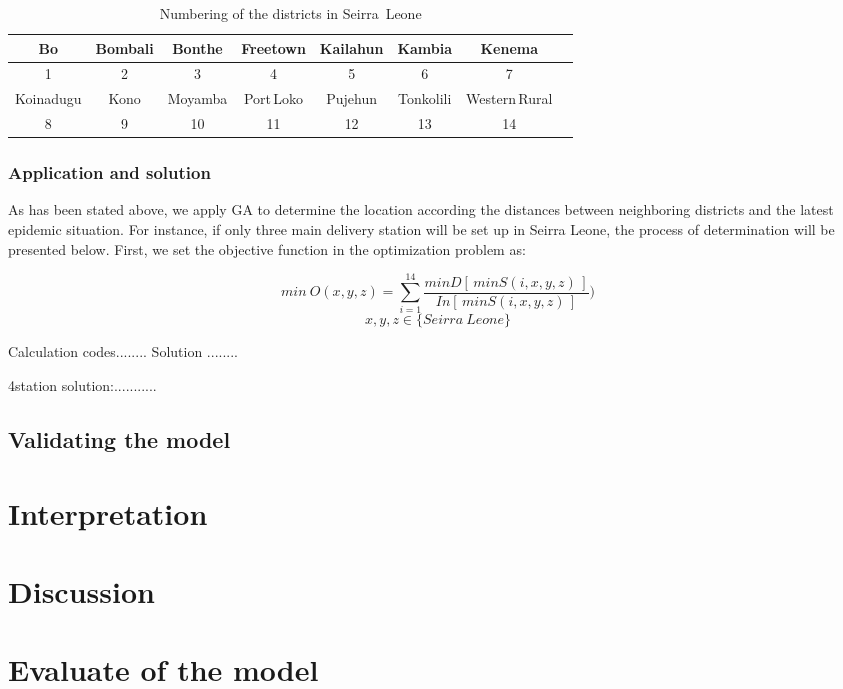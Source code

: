 \begin{table}[h!]
\caption{Numbering of the districts in Seirra\ Leone} 
\medskip
\centering
\begin{tabular}{c c c c c c c c}
\hline
Bo & Bombali & Bonthe & Freetown & Kailahun & Kambia & Kenema  \\ 
\hline
1 & 2& 3 & 4 & 5 & 6 & 7 \\ 
\hline
Koinadugu & Kono & Moyamba & Port\,Loko & Pujehun & Tonkolili & Western\,Rural  \\ 
\hline
8 & 9 & 10 & 11 & 12 & 13 & 14 \\ 
\hline
\end{tabular}

\label{t:numberingofSL}
\end{table}

\subsubsection{Application and solution}
As has been stated above, we apply GA to determine the location according the distances between neighboring districts and the latest epidemic situation. For instance, if only three main delivery station will be set up in Seirra Leone, the process of determination will be presented below.
First, we set the objective function in the optimization problem as:

$$min\ O(x,y,z)=\sum^{14}_{i=1}\frac {minD[\,minS(i,x,y,z)\,]}{In[\, minS(i,x,y,z)\,]}) $$
$$x,y,z\in\{Seirra\ Leone\}$$

Calculation        codes........
Solution       ........

4station  solution:...........


\subsection{Validating the model}%

\section{Interpretation}

\section{Discussion}

\section{Evaluate of the model}

